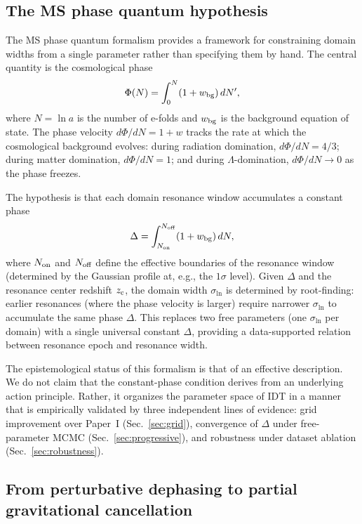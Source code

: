 \documentclass[aps,prd,twocolumn,superscriptaddress,nofootinbib]{revtex4-2}
\newcommand{\zc}{z_{\rm c}}
\newcommand{\sln}{\sigma_{\ln}}
\begin{document}
\subsection{The MS phase quantum hypothesis}
\label{sec:phase_hypothesis}

The MS phase quantum formalism provides a framework for constraining
domain widths from a single parameter rather than specifying them by
hand. The central quantity is the cosmological phase
\begin{equation}
\Phi(N) = \int_0^N (1 + w_{\rm bg})\, dN',
\label{eq:cosmo_phase}
\end{equation}
where $N = \ln a$ is the number of e-folds and $w_{\rm bg}$ is the
background equation of state. The phase velocity $d\Phi/dN = 1 + w$
tracks the rate at which the cosmological background evolves: during
radiation domination, $d\Phi/dN = 4/3$; during matter domination,
$d\Phi/dN = 1$; and during $\Lambda$-domination, $d\Phi/dN \to 0$ as
the phase freezes.

The hypothesis is that each domain resonance window accumulates a
constant phase
\begin{equation}
\Delta = \int_{N_{\rm on}}^{N_{\rm off}} (1 + w_{\rm bg})\, dN,
\label{eq:phase_quantum}
\end{equation}
where $N_{\rm on}$ and $N_{\rm off}$ define the effective boundaries
of the resonance window (determined by the Gaussian profile at, e.g.,
the $1\sigma$ level). Given $\Delta$ and the resonance center
redshift $\zc$, the domain width $\sln$ is determined by root-finding:
earlier resonances (where the phase velocity is larger) require
narrower $\sln$ to accumulate the same phase $\Delta$. This replaces
two free parameters (one $\sln$ per domain) with a single universal
constant $\Delta$, providing a data-supported relation between
resonance epoch and resonance width.

The epistemological status of this formalism is that of an effective
description. We do not claim that the constant-phase condition derives
from an underlying action principle. Rather, it organizes the
parameter space of IDT in a manner that is empirically validated by
three independent lines of evidence: grid improvement over Paper~I
(Sec.~\ref{sec:grid}), convergence of $\Delta$ under free-parameter
MCMC (Sec.~\ref{sec:progressive}), and robustness under dataset
ablation (Sec.~\ref{sec:robustness}).

\subsection{From perturbative dephasing to partial gravitational cancellation}
\label{sec:perturbative_to_partial}
\end{document}
